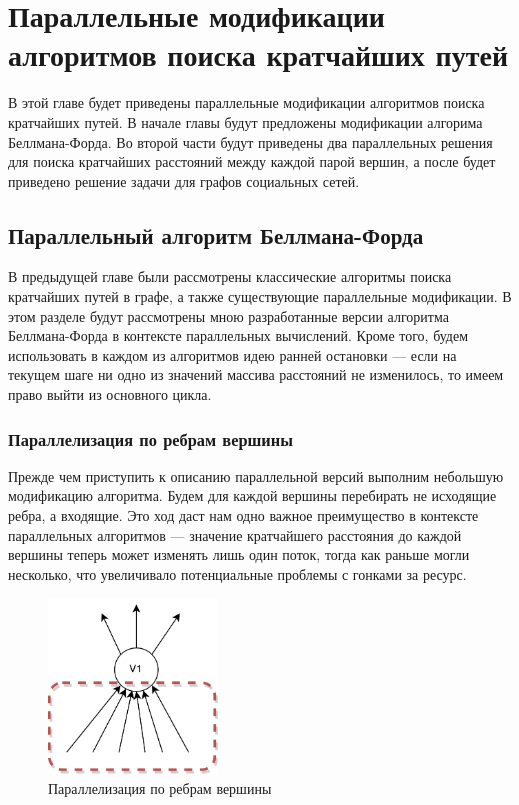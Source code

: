\chapter{ 
Параллельные модификации алгоритмов поиска кратчайших путей}

В этой главе будет приведены параллельные модификации алгоритмов поиска кратчайших путей. В начале главы будут предложены модификации алгорима Беллмана-Форда. Во второй части будут приведены два параллельных решения для поиска кратчайших расстояний между каждой парой вершин, а после будет приведено решение задачи для графов социальных сетей.

\FloatBarrier
\section{Параллельный алгоритм Беллмана-Форда}\label{bf_par_secion}

В предыдущей главе были рассмотрены классические алгоритмы поиска кратчайших путей в графе, а также существующие параллельные модификации. В этом разделе будут рассмотрены мною разработанные версии алгоритма Беллмана-Форда в контексте параллельных вычислений. Кроме того, будем использовать в каждом из алгоритмов идею ранней остановки --- если на текущем шаге ни одно из значений массива расстояний не изменилось, то имеем право выйти из основного цикла. 

\FloatBarrier
\subsection{Параллелизация по ребрам вершины}

Прежде чем приступить к описанию параллельной версий выполним небольшую модификацию алгоритма. Будем для каждой вершины перебирать не исходящие ребра, а входящие. Это ход даст нам одно важное преимущество в контексте параллельных алгоритмов --- значение кратчайшего расстояния до каждой вершины теперь может изменять лишь один поток, тогда как раньше могли несколько, что увеличивало потенциальные проблемы с гонками за ресурс.

\begin{figure}[h]
\centering
\includegraphics[width=0.4\textwidth]{img/bf_par_1.png}
\caption{Параллелизация по ребрам вершины}
\label{bf_par_1}
\end{figure}


